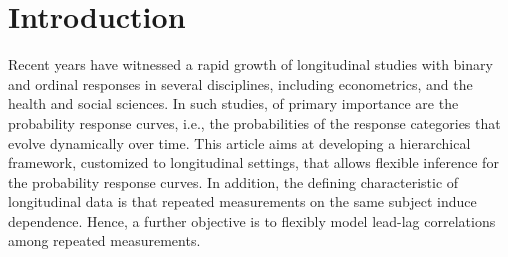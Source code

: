 

\section{Introduction}
\label{sec:intro}

Recent years have witnessed a rapid growth of longitudinal studies with binary and 
ordinal responses in several disciplines, including econometrics, and the health 
and social sciences. In such studies, of primary importance are the probability 
response curves, i.e., the probabilities of the response categories that evolve
dynamically over time.
This article aims at developing a hierarchical framework, 
customized to longitudinal settings, that allows flexible inference for the probability 
response curves. In addition, the defining characteristic of longitudinal data is that 
repeated measurements on the same subject induce dependence. Hence, a further objective 
is to %
flexibly model lead-lag correlations among repeated measurements. 





